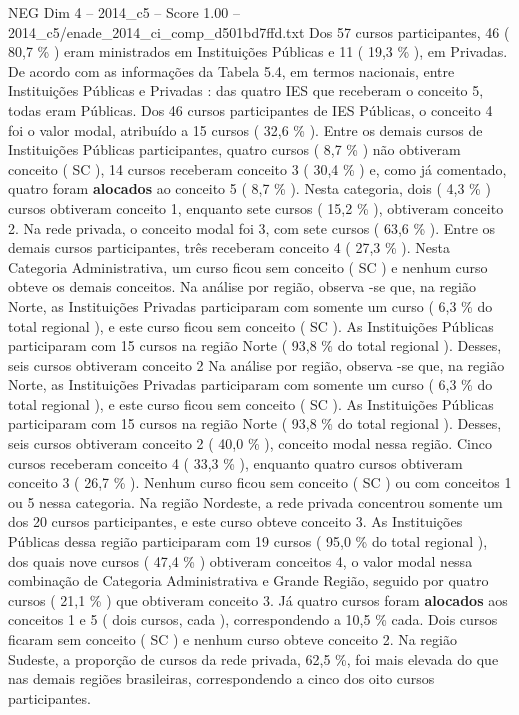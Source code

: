 \begin{textsample}{NEG Dim 4 – 2014\_c5 – Score 1.00 – 2014\_c5/enade\_2014\_ci\_comp\_d501bd7ffd.txt}
Dos 57 cursos participantes, 46 ( 80,7 \% ) eram ministrados em Instituições Públicas e 11 ( 19,3 \% ), em Privadas.
De acordo com as informações da Tabela 5.4, em termos nacionais, entre Instituições Públicas e Privadas : das quatro IES que receberam o conceito 5, todas eram Públicas.
Dos 46 cursos participantes de IES Públicas, o conceito 4 foi o valor modal, atribuído a 15 cursos ( 32,6 \% ).
Entre os demais cursos de Instituições Públicas participantes, quatro cursos ( 8,7 \% ) não obtiveram conceito ( SC ), 14 cursos receberam conceito 3 ( 30,4 \% ) e, como já comentado, quatro foram \textbf{alocados} ao conceito 5 ( 8,7 \% ).
Nesta categoria, dois ( 4,3 \% ) cursos obtiveram conceito 1, enquanto sete cursos ( 15,2 \% ), obtiveram conceito 2.
Na rede privada, o conceito modal foi 3, com sete cursos ( 63,6 \% ).
Entre os demais cursos participantes, três receberam conceito 4 ( 27,3 \% ).
Nesta Categoria Administrativa, um curso ficou sem conceito ( SC ) e nenhum curso obteve os demais conceitos.
Na análise por região, observa -se que, na região Norte, as Instituições Privadas participaram com somente um curso ( 6,3 \% do total regional ), e este curso ficou sem conceito ( SC ).
As Instituições Públicas participaram com 15 cursos na região Norte ( 93,8 \% do total regional ).
Desses, seis cursos obtiveram conceito 2 Na análise por região, observa -se que, na região Norte, as Instituições Privadas participaram com somente um curso ( 6,3 \% do total regional ), e este curso ficou sem conceito ( SC ).
As Instituições Públicas participaram com 15 cursos na região Norte ( 93,8 \% do total regional ).
Desses, seis cursos obtiveram conceito 2 ( 40,0 \% ), conceito modal nessa região.
Cinco cursos receberam conceito 4 ( 33,3 \% ), enquanto quatro cursos obtiveram conceito 3 ( 26,7 \% ).
Nenhum curso ficou sem conceito ( SC ) ou com conceitos 1 ou 5 nessa categoria.
Na região Nordeste, a rede privada concentrou somente um dos 20 cursos participantes, e este curso obteve conceito 3.
As Instituições Públicas dessa região participaram com 19 cursos ( 95,0 \% do total regional ), dos quais nove cursos ( 47,4 \% ) obtiveram conceitos 4, o valor modal nessa combinação de Categoria Administrativa e Grande Região, seguido por quatro cursos ( 21,1 \% ) que obtiveram conceito 3.
Já quatro cursos foram \textbf{alocados} aos conceitos 1 e 5 ( dois cursos, cada ), correspondendo a 10,5 \% cada.
Dois cursos ficaram sem conceito ( SC ) e nenhum curso obteve conceito 2.
Na região Sudeste, a proporção de cursos da rede privada, 62,5 \%, foi mais elevada do que nas demais regiões brasileiras, correspondendo a cinco dos oito cursos participantes.

\end{textsample}
